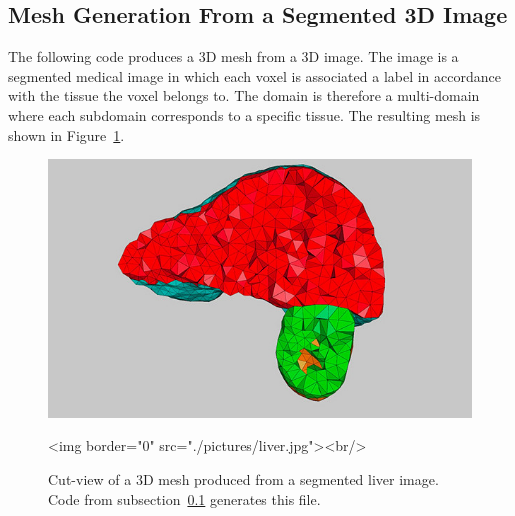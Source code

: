 \subsection{Mesh Generation From a Segmented 3D Image}
\label{Mesh_3_subsection_examples_3d_image}
The following code produces  a 3D mesh from
a 3D image. The image is a segmented medical image  in which each 
voxel  is associated a label  in accordance with
the tissue  the voxel belongs to.
The domain is therefore a multi-domain
where each subdomain corresponds to a specific tissue.
The resulting mesh is shown in Figure~\ref{figure:liver_3d_image_mesh}.


\begin{figure}[ht]
\begin{center}
 \begin{ccTexOnly}
   \includegraphics[width=14cm]{Mesh_3/pictures/liver}
 \end{ccTexOnly}
 \begin{ccHtmlOnly}
   <img border="0" src="./pictures/liver.jpg"><br/>
 \end{ccHtmlOnly}
 \caption{Cut-view of a 3D mesh produced from a segmented liver image. Code from
 subsection~\ref{Mesh_3_subsection_examples_3d_image} generates this file.}
  \label{figure:liver_3d_image_mesh}
\end{center}
\end{figure}
